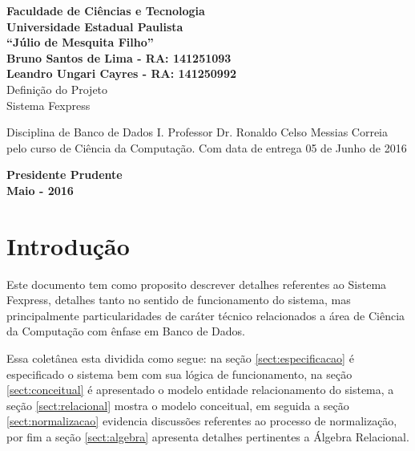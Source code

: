 \documentclass[12pt, onecolumn, titlepage]{article}
\begin{document}

\begin{titlepage} %
	
	\vfill
	\begin{center}
	
		{\large \textbf{Faculdade de Ciências e Tecnologia\\Universidade Estadual Paulista\\``Júlio de Mesquita Filho''}} \\[3cm]
		{\small \textbf{Bruno Santos de Lima - RA: 141251093}}\\
		{\small \textbf{Leandro Ungari Cayres - RA: 141250992}}\\[3cm]
		{\Large Definição do Projeto}\\
		{\Large Sistema Fexpress}\\[3cm]

	\hspace{.45\textwidth} %
	\begin{minipage}{.5\textwidth}
		\small Disciplina de Banco de Dados I. Professor Dr. Ronaldo Celso Messias Correia pelo curso de Ciência da Computação. Com data de entrega 05 de Junho de 2016 \\[0.5cm]
	\end{minipage}

	\vfill
	\vspace{1.5cm}
	
	\large \textbf{Presidente Prudente\\}
	\large \textbf{Maio - 2016}
	
	\end{center}
	
\end{titlepage}
\newpage

\renewcommand{\contentsname}{Índice}
\tableofcontents

\newpage

\section{Introdução}
\label{sect:introducao}

Este documento tem como proposito descrever detalhes referentes ao Sistema Fexpress, detalhes tanto no sentido de funcionamento do sistema, mas principalmente particularidades de caráter técnico relacionados a área de Ciência da Computação com ênfase em Banco de Dados. 

Essa coletânea esta dividida como segue: na seção \ref{sect:especificacao} é especificado o sistema bem com sua lógica de funcionamento, na seção \ref{sect:conceitual} é apresentado o modelo entidade relacionamento do sistema, a seção \ref{sect:relacional} mostra o modelo conceitual, em seguida a seção \ref{sect:normalizacao} evidencia discussões referentes ao processo de normalização, por fim a seção \ref{sect:algebra} apresenta detalhes pertinentes a Álgebra Relacional.
\end{document}
